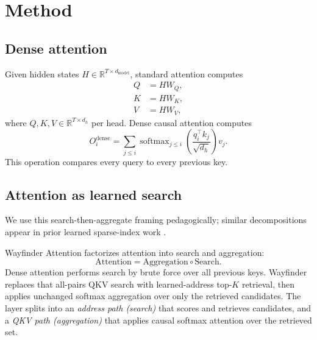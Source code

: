 \documentclass{article}
\begin{document}
\section{Method}

\subsection{Dense attention}

Given hidden states $H \in \mathbb{R}^{T \times d_{\mathrm{model}}}$, standard attention computes
\begin{align}
Q &= H W_Q, \\
K &= H W_K, \\
V &= H W_V,
\end{align}
where $Q,K,V \in \mathbb{R}^{T \times d_h}$ per head. Dense causal attention computes
\begin{equation}
O_i^{\mathrm{dense}}
=
\sum_{j \le i}
\operatorname{softmax}_{j \le i}
\left(
\frac{q_i^\top k_j}{\sqrt{d_h}}
\right)
v_j .
\end{equation}
This operation compares every query to every previous key.

\subsection{Attention as learned search}

We use this search-then-aggregate framing pedagogically; similar decompositions appear in prior learned sparse-index work \cite{sun2022lha,deepseek2025v32,desai2025hashattention}.

Wayfinder Attention factorizes attention into search and aggregation:
\begin{equation}
\mathrm{Attention}
=
\mathrm{Aggregation}
\circ
\mathrm{Search}.
\end{equation}
Dense attention performs search by brute force over all previous keys. Wayfinder replaces that all-pairs QKV search with learned-address top-$K$ retrieval, then applies unchanged softmax aggregation over only the retrieved candidates. The layer splits into an \emph{address path (search)} that scores and retrieves candidates, and a \emph{QKV path (aggregation)} that applies causal softmax attention over the retrieved set.
\end{document}
